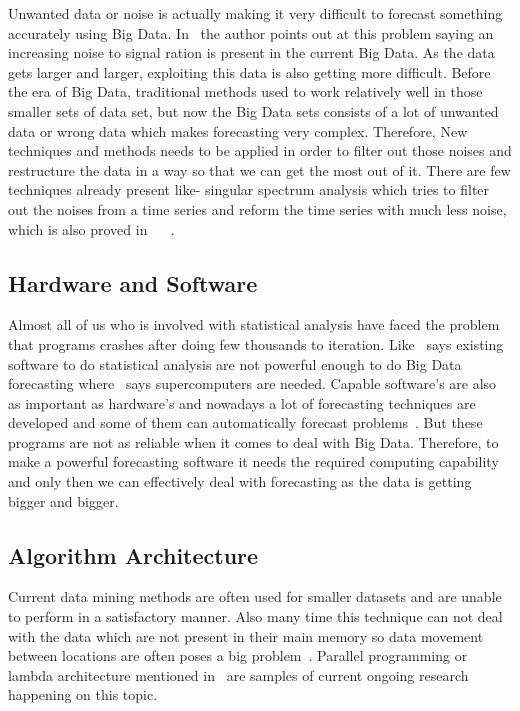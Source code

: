 Unwanted data or noise is actually making it very difficult to forecast something accurately using Big Data. In~\cite{silver2012signal} the author points out at this problem saying an increasing noise to signal ration is present in the current Big Data. As the data gets larger and larger, exploiting this data is also getting more difficult. Before the era of Big Data, traditional methods used to work relatively well in those smaller sets of data set, but now the Big Data sets consists of a lot of unwanted data or wrong data which makes forecasting very complex. Therefore, New techniques and methods needs to be applied in order to filter out those noises and restructure the data in a way so that we can get the most out of it. There are few techniques already present like- singular spectrum analysis which tries to filter out the noises from a time series and reform the time series with much less noise, which is also proved in ~\cite{hassani2009forecasting} ~\cite{hassani2015forecasting}.

\subsection{Hardware and Software}
\label{Hardsoft}

Almost all of us who is involved with statistical analysis have faced the problem that programs crashes after doing few thousands to iteration. Like~\cite{arribas2014accidental} says existing software to do statistical analysis are not powerful enough to do Big Data forecasting where~\cite{needham2013disruptive} says supercomputers are needed. Capable software’s are also as important as hardware’s and nowadays a lot of forecasting techniques are developed and some of them can automatically forecast problems~\cite{hyndman2013forecasting}. But these programs are not as reliable when it comes to deal with Big Data. Therefore, to make a powerful forecasting software it needs the required computing capability and only then we can effectively deal with forecasting as the data is getting bigger and bigger. 

\subsection{Algorithm Architecture}
\label{Algo}

Current data mining methods are often used for smaller datasets and are unable to perform in a satisfactory manner. Also many time this technique can not deal with the data which are not present in their main memory so data movement between locations are often poses a big problem~\cite{jadhav2013big}. Parallel programming or lambda architecture mentioned in~\cite{marz2015big} are samples of current ongoing research happening on this topic.

